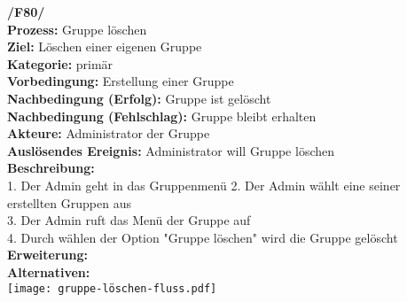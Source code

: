 \documentclass{article}
\begin{document}
\textbf{/F80/} \\
\textbf{Prozess:} Gruppe löschen \\
\textbf{Ziel:} Löschen einer eigenen Gruppe \\
\textbf{Kategorie:} primär \\
\textbf{Vorbedingung:} Erstellung einer Gruppe \\
\textbf{Nachbedingung (Erfolg):} Gruppe ist gelöscht\\
\textbf{Nachbedingung (Fehlschlag):} Gruppe bleibt erhalten\\
\textbf{Akteure:} Administrator der Gruppe \\
\textbf{Auslösendes Ereignis:} Administrator will Gruppe löschen\\
\textbf{Beschreibung:} \\
1. Der Admin geht in das Gruppenmenü
2. Der Admin wählt eine seiner erstellten Gruppen aus \\
3. Der Admin ruft das Menü der Gruppe auf \\
4. Durch wählen der Option "Gruppe löschen" wird die Gruppe gelöscht \\
\textbf{Erweiterung:} \\
\textbf{Alternativen:} \\

\texttt{[image: gruppe-löschen-fluss.pdf]}
\end{document}

